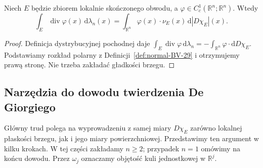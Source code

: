 \begin{twierdzenie}
\label{thm:gauss-green-BV-29}
Niech $E$ będzie zbiorem lokalnie skończonego
obwodu, a $\varphi\in C_c^1(\mathbb R^n;\mathbb R^n)$.
Wtedy
\begin{equation}\label{eq:gauss-green-BV-29}
 \int_E\operatorname{div}\varphi(x)
 \,\mathrm d\lambda_n(x)
 =\int_{\mathbb R^n}\varphi(x)\cdot\nu_E(x)
 \,\mathrm d|D\chi_E|(x).
\end{equation}
\end{twierdzenie}
\begin{proof}
Definicja dystrybucyjnej pochodnej daje
$\int_E\operatorname{div}\varphi\,\mathrm d\lambda_n=-\int_{\mathbb R^n}\varphi\cdot\mathrm dD\chi_E$.
Podstawiamy rozkład polarny z
Definicji~\ref{def:normal-BV-29} i otrzymujemy
prawą stronę. Nie trzeba zakładać gładkości brzegu.
\end{proof}

\subsection*{Narzędzia do dowodu twierdzenia De Giorgiego}
Główny trud polega na wyprowadzeniu z samej miary $D\chi_E$
zarówno lokalnej płaskości brzegu, jak i jego miary powierzchniowej.
Przedstawimy ten argument w kilku krokach. W tej części zakładamy
$n\ge2$; przypadek $n=1$ omówimy na końcu dowodu.
Przez $\omega_j$ oznaczamy objętość kuli jednostkowej
w $\mathbb R^j$.


